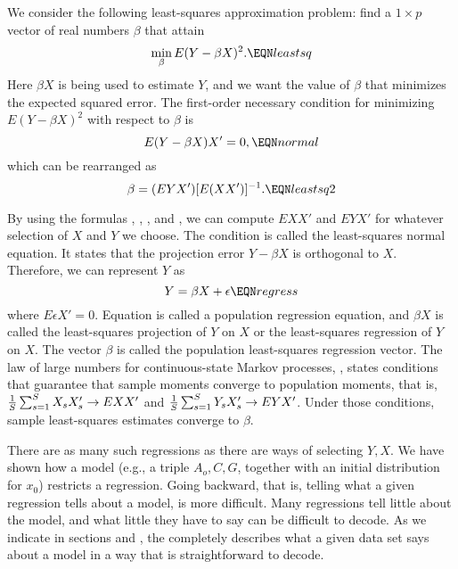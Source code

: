   We consider the following least-squares approximation problem:
find a  $1\times p$ vector of real numbers $\beta$ that attain
$$ \min_\beta E (Y -  \beta X)^2.  \EQN leastsq  $$
Here $ \beta X$ is being  used to estimate $Y$, and we want the
value of $\beta$ that minimizes the expected squared error. The
first-order necessary condition for minimizing $E (Y -  \beta
X)^2$ with respect to $\beta$ is
$$ E  (Y -  \beta  X) X' = 0 , \EQN normal$$
which  can be rearranged as
$$ \beta =  (  E    YX') [E(X X')]^{-1}.  \EQN leastsq2  $$

  By using the formulas , , ,  and
, we can compute $E  X X'$ and $E Y X'$ for whatever
selection of $X$ and $Y$ we choose. The condition  is
called the least-squares normal equation.  It states that the
projection error $Y - \beta X $ is orthogonal to $X$. Therefore,
we can represent $Y$ as
$$ Y =  \beta X + \epsilon \EQN regress $$
where $E  \epsilon X' =0$.   Equation  is called a
population regression equation, and $\beta X $ is called the least-squares
projection of $Y$ on $X$ or the least-squares regression of $Y$ on
$X$. The vector $\beta$ is called the population least-squares
regression vector.
 The law of large numbers for continuous-state Markov processes,
,
%
states conditions  that guarantee that sample moments converge to
population moments, that is, ${1 \over S} \sum_{s=1}^S  X_s X_s'
\rightarrow E  X X' $ and ${ 1\over S} \sum_{s=1}^S  Y_s X_s'
\rightarrow E  Y X'$. Under those conditions, sample least-squares
estimates converge to $\beta$. 


  There are as many such regressions  as there are ways of selecting
$Y, X$.    We have shown how a model (e.g., a triple $A_o, C, G$,
together with an initial distribution for $x_0$) restricts a
regression.    Going backward, that is, telling what a given
regression tells about a model, is more difficult. Many regressions tell little about the model, and what little they
have to say can be difficult to decode.    As we indicate in sections  and , the  completely describes what a given data set says about a model in a way that  is straightforward to decode.

